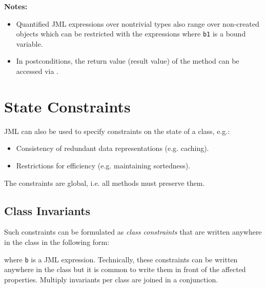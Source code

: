 		\textbf{Notes:}
		\begin{itemize}
			\item Quantified JML expressions over nontrivial types also range over non-created objects which can be restricted with the expressions  where \texttt{b1} is a bound variable.
			\item In postconditions, the return value (result value) of the method can be accessed via \inlineJava{\\result}.
		\end{itemize}

	\section{State Constraints}
		JML can also be used to specify constraints on the state of a class, e.g.:
		\begin{itemize}
			\item Consistency of redundant data representations (e.g. caching).
			\item Restrictions for efficiency (e.g. maintaining sortedness).
		\end{itemize}
		The constraints are global, i.e. all methods must preserve them.

		\subsection{Class Invariants}
			\label{sec:classinv}
		
			Such constraints can be formulated as \textit{class constraints} that are written anywhere in the class in the following form:
			\begin{center}
			\end{center}
			where \texttt{b} is a  JML expression. Technically, these constraints can be written anywhere in the class but it is common to write them in front of the affected properties. Multiply invariants per class are joined in a conjunction.
			
